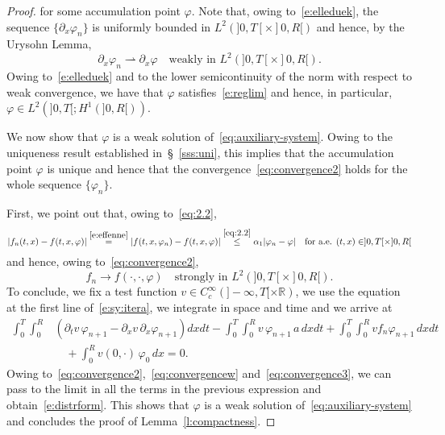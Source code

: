\documentclass[11pt,leqno]{amsart}
\numberwithin{equation}{section}
\begin{document}
\begin{proof}
 for some accumulation point ${\varphi}$. Note that, owing to~\eqref{e:elleduek}, the sequence 
 $\{ {\partial_x } {\varphi}_n \}$ is uniformly bounded in $L^2 (]0,T[ \times ]0, R[)$
 and hence, by the Urysohn Lemma,
 \begin{equation}
 \label{eq:convergencew}
     {\partial_x } {\varphi}_n {\rightharpoonup} {\partial_x } {\varphi} \quad \text{weakly in $L^2 (]0, T[\times ]0, R[)$}. 
 \end{equation}
Owing to~\eqref{e:elleduek} and to the lower semicontinuity of the norm with respect to weak convergence, we have that ${\varphi}$ satisfies~\eqref{e:reglim} and hence, in particular, 
${\varphi} \in L^2 (]0, T[; H^1 (]0, R[))$. 

We now show that ${\varphi}$ is a weak solution of~\eqref{eq:auxiliary-system}. Owing to the uniqueness result established in~\S~\ref{sss:uni}, this implies that the accumulation point ${\varphi}$ is unique and hence that the
convergence~\eqref{eq:convergence2} holds for the whole sequence
$\{ {\varphi}_n \}$. 

First, we point out that, owing to~\eqref{eq:2.2}, 
$$
    |f_n (t, x) - f(t, x, {\varphi}) |
    \stackrel{\eqref{e:effenne}}{=}
    |f(t, x, {\varphi}_n) - f(t, x, {\varphi})| \stackrel{\eqref{eq:2.2}}{\leq} 
    \alpha_1 |{\varphi}_n - {\varphi}| \quad 
    \text{for a.e. $(t, x) \in ]0, T[ \times ]0, R[$}
 $$
and hence, owing to~\eqref{eq:convergence2},  
\begin{equation}
\label{eq:convergence3}
    f_n \to f(\cdot, \cdot, {\varphi}) 
     \quad \text{strongly in $L^2 (]0, T[\times ]0, R[)$}. 
\end{equation}
To conclude, we fix a test function
$v \in C^\infty_c (]-\infty, T[ \times {\mathbb{R}})$,
we use the equation at the first line of~\eqref{e:sy:itera}, we integrate in space and time and we arrive at 
\begin{equation*}
\begin{split}
\int_0^T \!\int_0^R &
 \left({\partial_t} v \,  {\varphi}_{n+1}-{\partial_x } v\, {\partial_x } {\varphi}_{n+1}
  \right) dx dt-\int_0^T\! \int_0^R v \, {\varphi}_{n+1} \, a \, dx dt 
+\int_0^T \! \int_0^R v f_n {\varphi}_{n+1} \, dxdt \\
& \quad +
\int_0^Rv(0, \cdot )\, {\varphi}_0 \, dx=0.
\end{split}
\end{equation*}
Owing to~\eqref{eq:convergence2},~\eqref{eq:convergencew} and~\eqref{eq:convergence3}, we can pass to the limit in all the terms in the previous expression and obtain~\eqref{e:distrform}. This shows that ${\varphi}$ is a 
weak solution of~\eqref{eq:auxiliary-system} and concludes the proof of Lemma~\ref{l:compactness}.  
\end{proof}
\end{document}
